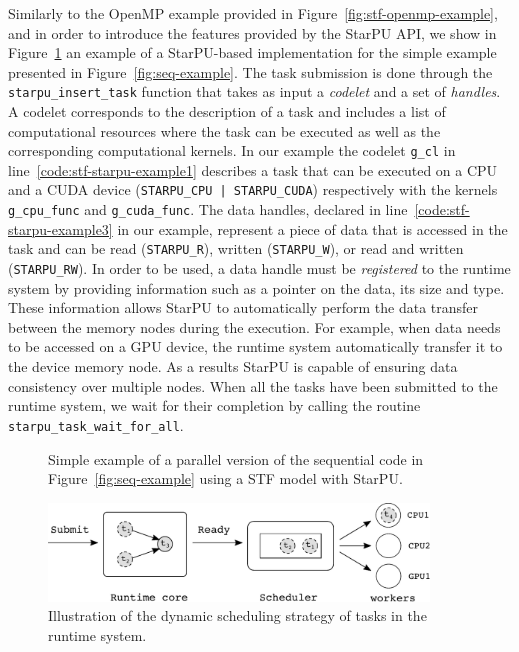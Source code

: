\documentclass{article}
\newcommand{\starpu}{{StarPU}\xspace}
\newcommand{\openmp}{OpenMP\xspace}
\begin{document}
Similarly to the \openmp example provided in
Figure~\ref{fig:stf-openmp-example}, and in order to introduce the
features provided by the StarPU API, we show in
Figure~\ref{fig:stf-starpu-example} an example of a StarPU-based
implementation for the simple example presented in
Figure~\ref{fig:seq-example}. The task submission is done through the
\texttt{starpu\_insert\_task} function that takes as input a
\textit{codelet} and a set of \textit{handles}. A codelet corresponds
to the description of a task and includes a list of computational
resources where the task can be executed as well as the corresponding
computational kernels. In our example the codelet \texttt{g\_cl} in
line~\ref{code:stf-starpu-example1} describes a task that can be
executed on a CPU and a CUDA device (\texttt{STARPU\_CPU |
  STARPU\_CUDA}) respectively with the kernels \texttt{g\_cpu\_func}
and \texttt{g\_cuda\_func}. The data handles, declared in
line~\ref{code:stf-starpu-example3} in our example, represent a piece
of data that is accessed in the task and can be read
(\texttt{STARPU\_R}), written (\texttt{STARPU\_W}), or read and
written (\texttt{STARPU\_RW}). In order to be used, a data handle must
be \textit{registered} to the runtime system by providing information
such as a pointer on the data, its size and type. These information
allows StarPU to automatically perform the data transfer between the
memory nodes during the execution. For example, when data needs to be
accessed on a GPU device, the runtime system automatically transfer it
to the device memory node. As a results StarPU is capable of ensuring
data consistency over multiple nodes. When all the tasks have been
submitted to the runtime system, we wait for their completion by
calling the routine \texttt{starpu\_task\_wait\_for\_all}.

\begin{figure}[!h]
  \centering 
  \caption{\label{fig:stf-starpu-example}Simple example of a parallel version
    of the sequential code in Figure~\ref{fig:seq-example} using a STF
    model with \starpu.}
\end{figure}

\begin{figure}[!h]
    \centering
    \includegraphics[width=0.9\textwidth]{figures/scheduler}
    \caption{\label{fig:scheduler} Illustration of the dynamic
      scheduling strategy of tasks in the runtime system.}
\end{figure}
\end{document}
